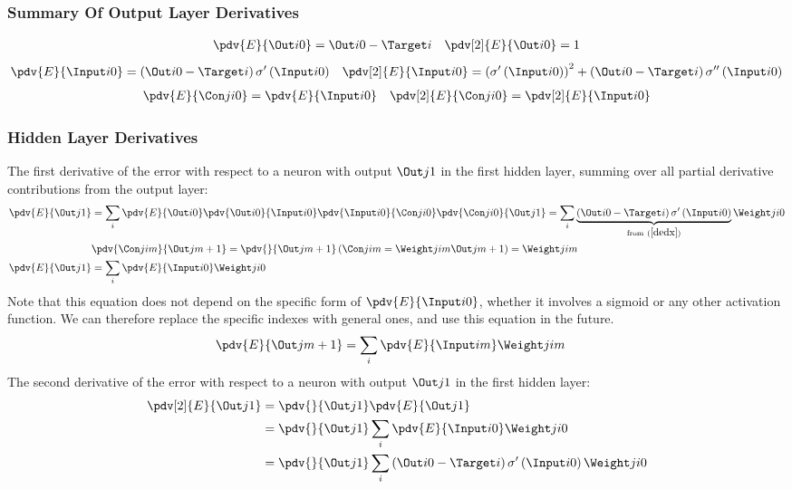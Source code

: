 \subsubsection{Summary Of Output Layer Derivatives}
\begin{align}
&\pdv{E}{\Out i 0} = \Out i 0 - \Target i 
&
\pdv[2]{E}{{\Out i 0}} = 1
\end{align}
\begin{align}
&\pdv{E}{\Input i 0} = \left(\Out i 0 - \Target i\right)\sigma^{\prime}\left(\Input i 0\right)
& 
\pdv[2]{E}{{\Input i 0}} = \left(\sigma^{\prime}\left(\Input i 0\right)\right)^2 + \left(\Out i 0 - \Target i\right)\sigma^{\prime\prime}\left(\Input i 0\right)
\end{align}
\begin{align}
&\pdv{E}{{\Con j i 0}} = \pdv{E}{{\Input i 0}}
&
\pdv[2]{E}{{\Con j i 0}} = \pdv[2]{E}{{\Input i 0}}
\end{align}


\subsubsection{Hidden Layer Derivatives}
The first derivative of the error with respect to a neuron with output $\Out j 1$ in the first hidden layer, summing over all partial derivative contributions from the output layer:
\begin{align}
\pdv{E}{\Out j 1} &= 
\sum_i
\pdv{E}{\Out i 0}
\pdv{\Out i 0}{\Input i 0}
\pdv{\Input i 0}{\Con j i 0}
\pdv{\Con j i 0}{\Out j 1}
= 
\sum_i
\underbrace{\left(\Out i 0 - \Target i\right)\sigma^{\prime}\left(\Input i 0\right)}
_{\text{from} \ (\ref{dedx})}
\Weight j i 0
\\
&\pdv{{\Con j i m}}{{\Out j {m+1}}} = \pdv{}{{\Out j {m+1}}}\left(\Con j i m = \Weight j i m\Out j {m+1}\right) = \Weight j i m\label{dcdo}
\\
\pdv{E}{\Out j 1} &= \sum_i\pdv{E}{\Input i 0}\Weight j i 0
\end{align}
Note that this equation does not depend on the specific form of $\pdv{E}{\Input i 0}$, whether it involves a sigmoid or any other activation function. We can therefore replace the specific indexes with general ones, and use this equation in the future.
\begin{align}
\pdv{E}{\Out j {m+1}} &= \sum_i\pdv{E}{\Input i m}\Weight j i m\label{dedo_general}
\end{align}
The second derivative of the error with respect to a neuron with output $\Out j 1$ in the first hidden layer:
\begin{align}
\pdv[2]{E}{{\Out j 1}} &= 
\pdv{}{\Out j 1}
\pdv{E}{\Out j 1}
\\
&= \pdv{}{\Out j 1}
\sum_i\pdv{E}{\Input i 0}\Weight j i 0
\\
&= \pdv{}{\Out j 1}
\sum_i
\left(\Out i 0 - \Target i\right)\sigma^{\prime}\left(\Input i 0\right)\Weight j i 0
\end{align}

